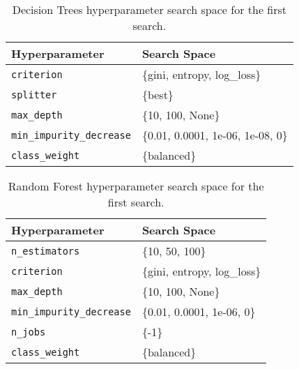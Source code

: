 \begin{table}[H]
\centering
\capstart
\begin{tabularx}{0.48\textwidth}{|l|X|}
\hline
Hyperparameter & Search Space \\
\hline
\texttt{criterion} & \{gini, entropy, log\_loss\} \\
\texttt{splitter} & \{best\} \\
\texttt{max\_depth} & \{10, 100, None\} \\
\texttt{min\_impurity\_decrease} & \{0.01, 0.0001, 1e-06, 1e-08, 0\} \\
\texttt{class\_weight} & \{balanced\} \\
\hline
\end{tabularx}
\caption{Decision Trees hyperparameter search space for the first search.}
\label{tab:hyperparameters_decision_tree_0}

\end{table}


\begin{table}[H]
\centering
\capstart
\begin{tabularx}{0.48\textwidth}{|l|X|}
\hline
Hyperparameter & Search Space \\
\hline
\texttt{n\_estimators} & \{10, 50, 100\} \\
\texttt{criterion} & \{gini, entropy, log\_loss\} \\
\texttt{max\_depth} & \{10, 100, None\} \\
\texttt{min\_impurity\_decrease} & \{0.01, 0.0001, 1e-06, 0\} \\
\texttt{n\_jobs} & \{-1\} \\
\texttt{class\_weight} & \{balanced\} \\
\hline
\end{tabularx}
\caption{Random Forest hyperparameter search space for the first search.}
\label{tab:hyperparameters_random_forest_0}

\end{table}


